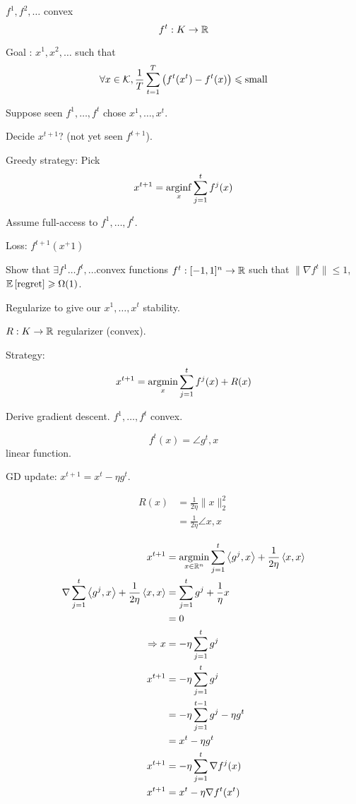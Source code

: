  $f^1, f^2,\ldots$ convex
\[
    f^t : K \to \mathbb{R}
\]

Goal : $x^1,x^2,\ldots$ such that
\[
    \forall x\in \mathcal{K}, \frac{1}{T} \sum\limits_{t=1}^T \left( f^t(x^t) - f^t(x) \right) \leqslant \text{small}
\]

Suppose seen $f^1, \ldots, f^t$ chose $x^1, \ldots, x^t$.

Decide $x^{t+1}$? (not yet seen $f^{t+1}$).

Greedy strategy: Pick
\[
    x^{t+1} = \underset{x}{\operatorname{arginf}} \sum\limits_{j=1}^t f^j(x)
\]

Assume full-access to $f^1,\ldots, f^t$.

Loss: $f^{t+1}(x^+1)$

\begin{exercise}
    Show that $\exists f^1\ldots f^t,\ldots $convex functions $f^t:[-1,1]^n \to \mathbb{R}$ such that $\lVert \nabla f^t \rVert \leqslant 1$, $\mathbb{E}\left[ \text{regret} \right] \geqslant \Omega(1)$.
\end{exercise}

Regularize to give our $x^1,\ldots,x^t$ stability.

$R:K\to\mathbb{R}$ regularizer (convex).

\bigskip

Strategy:
\[
    x^{t+1} = \underset{x}{\operatorname{argmin}} \sum\limits_{j=1}^t f^j(x) + R(x)
\]

Derive gradient descent. $f^1,\ldots, f^t$ convex.

\[
    f^t(x) = \angle{g^t, x}
\]
linear function.

GD update: $x^{t+1} = x^t - \eta g^t$.

\[
    \begin{aligned}
        R(x) &= \frac{1}{2 \eta} \lVert x \rVert_2^2\\
        &= \frac{1}{2 \eta} \angle{x,x}
    \end{aligned}
\]

\[
    \begin{aligned}
        x^{t+1} &= \underset{x\in\mathbb{R}^n}{\operatorname{argmin}} \sum\limits_{j=1}^t \left\langle g^j,x \right\rangle + \frac{1}{2\eta} \left\langle x,x \right\rangle\\
        \nabla \sum\limits_{j=1}^t \left\langle g^j,x \right\rangle + \frac{1}{2\eta} \left\langle x,x \right\rangle &= \sum\limits_{j=1}^t g^j + \frac{1}{\eta} x\\
        &= 0\\
        \Rightarrow x &= -\eta \sum\limits_{j=1}^t g^j\\
        x^{t+1} &= -\eta \sum\limits_{j=1}^t g^j\\
        &= -\eta \sum\limits_{j=1}^{t-1} g^j - \eta g^t\\
        &= x^t - \eta g^t\\
        x^{t+1} &= -\eta \sum_{j=1}^t \nabla f^j(x)\\
        x^{t+1} &= x^t - \eta \nabla f^t(x^t)
    \end{aligned}
\]

